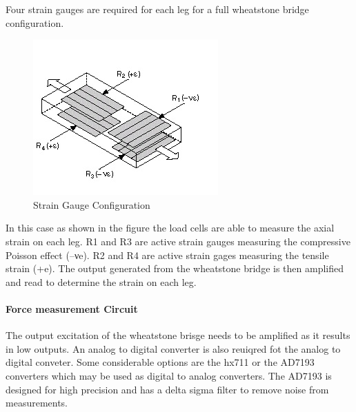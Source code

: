 Four strain gauges are required for each leg for a full wheatstone bridge configuration. 
\begin{center}
	\begin{figure}[!h]
		\centering
		\includegraphics{Figures/loadConf}
		\caption[Strain Gauge Configuration]{Strain Gauge Configuration \cite{noauthor_measuring_nodate}}
	\end{figure}
\end{center}
In this case as shown in the figure the load cells are able to measure the axial strain on each leg. R1 and R3 are active strain gauges measuring the compressive Poisson effect (–νe). R2 and R4 are active strain gages measuring the tensile strain (+e). The output generated from the wheatstone bridge is then amplified and read to determine the strain on each leg.

\paragraph{Force measurement Circuit}
The output excitation of the wheatstone brisge needs to be amplified as it results in low outputs. An analog to digital converter is also reuiqred fot the analog to digital conveter. Some considerable options are the hx711 or the AD7193 converters which may be used as digital to analog converters. The AD7193 is designed for high precision and has a delta sigma filter to remove noise from measurements. 


